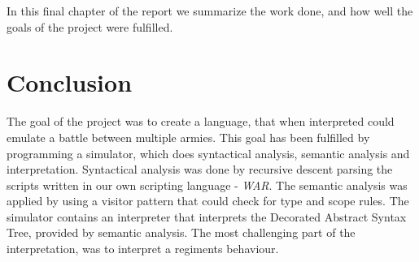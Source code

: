In this final chapter of the report we summarize the work done, and how well the goals of the project were fulfilled.
\section{Conclusion}
	The goal of the project was to create a language, that when interpreted could emulate a battle between multiple armies. 
	This goal has been fulfilled by programming a simulator, which does syntactical analysis, semantic analysis and interpretation.
	Syntactical analysis was done by recursive descent parsing the scripts written in our own scripting language - \textit{WAR}. The semantic analysis was applied by using 
	a visitor pattern that could check for type and scope rules. The simulator contains an interpreter that interprets the Decorated Abstract Syntax Tree, provided by semantic analysis.
	The most challenging part of the interpretation, was to interpret a regiments behaviour. \\
	
